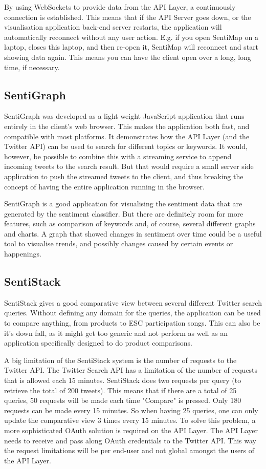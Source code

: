 By using WebSockets to provide data from the API Layer, a continuously connection is established. This means that if the API Server goes down, or the visualisation application back-end server restarts, the application will automatically reconnect without any user action. E.g. if you open SentiMap on a laptop, closes this laptop, and then re-open it, SentiMap will reconnect and start showing data again. This means you can have the client open over a long, long time, if necessary.   

\subsection{SentiGraph}
SentiGraph was developed as a light weight JavaScript application that runs entirely in the client's web browser. This makes the application both fast, and compatible with most platforms. It demonstrates how the API Layer (and the Twitter API) can be used to search for different topics or keywords. It would, however, be possible to combine this with a streaming service to append incoming tweets to the search result. But that would require a small server side application to push the streamed tweets to the client, and thus breaking the concept of having the entire application running in the browser.

SentiGraph is a good application for visualising the sentiment data that are generated by the sentiment classifier. But there are definitely room for more features, such as comparison of keywords and, of course, several different graphs and charts. A graph that showed changes in sentiment over time could be a useful tool to visualise trends, and possibly changes caused by certain events or happenings. 

\subsection{SentiStack}

SentiStack gives a good comparative view between several different Twitter search queries. Without defining any domain for the queries, the application can be used to compare anything, from products to ESC participation songs. This can also be it's down fall, as it might get too generic and not perform as well as an application specifically designed to do product comparisons. 

A big limitation of the SentiStack system is the number of requests to the Twitter API. The Twitter Search API has a limitation of the number of requests that is allowed each 15 minutes. SentiStack does two requests per query (to retrieve the total of 200 tweets). This means that if there are a total of 25 queries, 50 requests will be made each time "Compare" is pressed. Only 180 requests can be made every 15 minutes. So when having 25 queries, one can only update the comparative view 3 times every 15 minutes. To solve this problem, a more sophisticated OAuth solution is required on the API Layer. The API Layer needs to receive and pass along OAuth credentials to the Twitter API. This way the request limitations will be per end-user and not global amongst the users of the API Layer.

